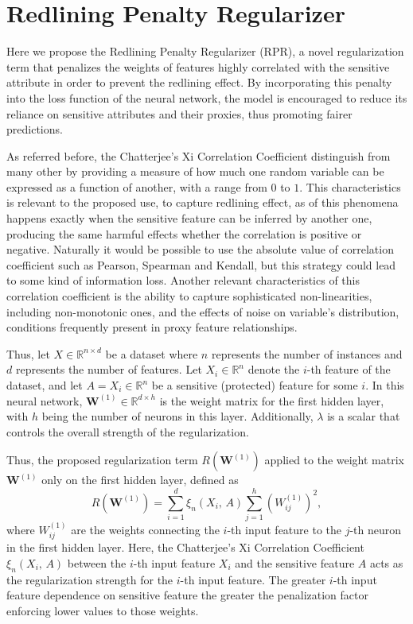\section{Redlining Penalty Regularizer}

Here we propose the Redlining Penalty Regularizer (RPR), a novel regularization term that penalizes the weights of features highly correlated with the sensitive attribute in order to prevent the redlining effect. By incorporating this penalty into the loss function of the neural network, the model is encouraged to reduce its reliance on sensitive attributes and their proxies, thus promoting fairer predictions.

As referred before, the Chatterjee's Xi Correlation Coefficient distinguish from many other by providing a measure of how much one random variable can be expressed as a function of another, with a range from $0$ to $1$. This characteristics is relevant to the proposed use, to capture redlining effect, as of this phenomena happens exactly when the sensitive feature can be inferred by another one, producing the same harmful effects whether the correlation is positive or negative. Naturally it would be possible to use the absolute value of correlation coefficient such as Pearson, Spearman and Kendall, but this strategy could lead to some kind of information loss. Another relevant characteristics of this correlation coefficient is the ability to capture sophisticated non-linearities, including non-monotonic ones, and the effects of noise on variable's distribution, conditions frequently present in proxy feature relationships. 

Thus, let $X \in \mathbb{R}^{n \times d}$ be a dataset where $n$ represents the number of instances and $d$ represents the number of features. Let $X_i \in \mathbb{R}^n$ denote the $i$-th feature of the dataset, and let $A = X_i \in \mathbb{R}^n$ be a sensitive (protected) feature for some $i$. In this neural network, $\mathbf{W}^{(1)} \in \mathbb{R}^{d \times h}$ is the weight matrix for the first hidden layer, with $h$ being the number of neurons in this layer. Additionally, $\lambda$ is a scalar that controls the overall strength of the regularization.

Thus, the proposed regularization term $R(\mathbf{W}^{(1)})$ applied to the weight matrix $\mathbf{W}^{(1)}$ only on the first hidden layer, defined as 
\begin{equation}\label{eq:xi_reg}
R(\mathbf{W}^{(1)}) = \sum_{i=1}^d \xi_n(X_i,\,A) \sum_{j=1}^h (W^{(1)}_{ij})^2,
\end{equation}
where $W^{(1)}_{ij}$ are the weights connecting the $i$-th input feature to the $j$-th neuron in the first hidden layer. Here, the Chatterjee's Xi Correlation Coefficient $\xi_n(X_i,\,A)$ between the $i$-th input feature $X_i$ and the sensitive feature $A$ acts as the regularization strength for the $i$-th input feature. The greater $i$-th input feature dependence on sensitive feature the greater the penalization factor enforcing lower values to those weights.

